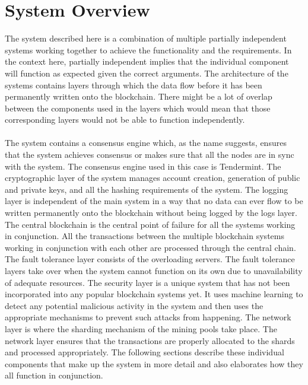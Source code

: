 \documentclass[a4paper,twoside,phd]{BYUPhys}
\begin{document}
\section{System Overview}
The system described here is a combination of multiple partially independent systems working together to achieve the functionality and the requirements. In the context here, partially independent implies that the individual component will function as expected given the correct arguments. The architecture of the systems contains layers through which the data flow before it has been permanently written onto the blockchain. There might be a lot of overlap between the components used in the layers which would mean that those corresponding layers would not be able to function independently. 
\\
\\
The system contains a consensus engine which, as the name suggests, ensures that the system achieves consensus or makes sure that all the nodes are in sync with the system. The consensus engine used in this case is Tendermint. The cryptographic layer of the system manages account creation, generation of public and private keys, and all the hashing requirements of the system. The logging layer is independent of the main system in a way that no data can ever flow to be written permanently onto the blockchain without being logged by the logs layer. The central blockchain is the central point of failure for all the systems working in conjunction. All the transactions between the multiple blockchain systems working in conjunction with each other are processed through the central chain. The fault tolerance layer consists of the overloading servers. The fault tolerance layers take over when the system cannot function on its own due to unavailability of adequate resources. The security layer is a unique system that has not been incorporated into any popular blockchain systems yet. It uses machine learning to detect any potential malicious activity in the system and then uses the appropriate mechanisms to prevent such attacks from happening. The network layer is where the sharding mechanism of the mining pools take place. The network layer ensures that the transactions are properly allocated to the shards and processed appropriately. The following sections describe these individual components that make up the system in more detail and also elaborates how they all function in conjunction. 
\end{document}
